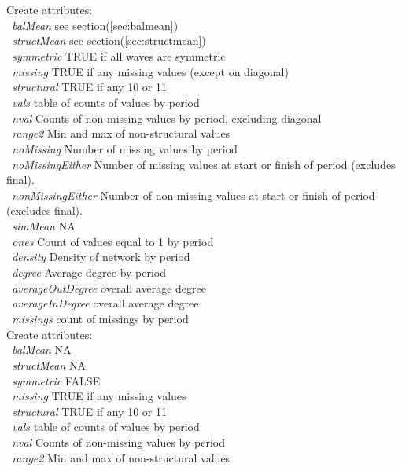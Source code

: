 \documentclass[12pt,a4paper]{article}
\renewcommand{\=}{\,=\,}
\newcommand{\+}{\,+\,}
\newcommand{\nnm}[1]{\textsf{\small\textit{#1}}}
\newcommand{\sfn}[1]{\textbf{\texttt{#1}}}
\begin{document}
\begin{algorithmic}
\STATE Create attributes:\\
\sfn{ }\nnm{balMean} see section(\ref{sec:balmean})\\
\sfn{ }\nnm{structMean} see section(\ref{sec:structmean})\\
\sfn{ }\nnm{symmetric} TRUE if all waves are symmetric\\
\sfn{ }\nnm{missing} TRUE if any missing values (except on diagonal)\\
\sfn{ }\nnm{structural} TRUE if any 10 or 11\\
\sfn{ }\nnm{vals} table of counts of values by period\\
\sfn{ }\nnm{nval} Counts of non-missing values by period, excluding diagonal\\
\sfn{ }\nnm{range2} Min and max of non-structural values\\
\sfn{ }\nnm{noMissing} Number of missing values by period\\
\sfn{ }\nnm{noMissingEither} Number of missing values at start or finish of
period (excludes final).\\
\sfn{ }\nnm{nonMissingEither} Number of non missing values at start or finish of
period (excludes final).\\
\sfn{ }\nnm{simMean} NA\\
\sfn{ }\nnm{ones} Count of values equal to 1 by period\\
\sfn{ }\nnm{density} Density of network by period\\
\sfn{ }\nnm{degree} Average degree by period\\
\sfn{ }\nnm{averageOutDegree} overall average degree\\
\sfn{ }\nnm{averageInDegree} overall average degree\\
\sfn{ }\nnm{missings} count of missings by period\\
\STATE Create attributes:\\
\sfn{ }\nnm{balMean} NA\\
\sfn{ }\nnm{structMean} NA\\
\sfn{ }\nnm{symmetric} FALSE\\
\sfn{ }\nnm{missing} TRUE if any missing values\\
\sfn{ }\nnm{structural} TRUE if any 10 or 11\\
\sfn{ }\nnm{vals} table of counts of values by period\\
\sfn{ }\nnm{nval} Counts of non-missing values by period\\
\sfn{ }\nnm{range2} Min and max of non-structural values\\

\end{algorithmic}
\end{document}
